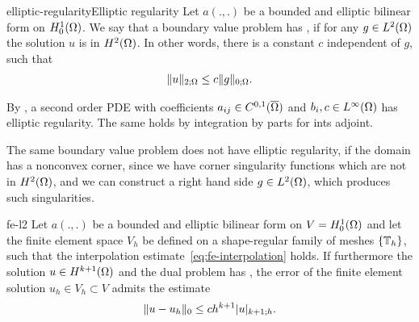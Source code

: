 \begin{Assumption*}{elliptic-regularity}{Elliptic regularity}
  Let $a(.,.)$ be a bounded and elliptic bilinear form on
  $H^1_0(\Omega)$. We say that a boundary value problem has
  , if for any $g\in L^2(\Omega)$ the
  solution $u$ is in $H^2(\Omega)$. In other words, there is a
  constant $c$ independent of $g$, such that
  \begin{gather}
    \lVert u\rVert_{2;\Omega} \le c \lVert g\rVert_{0;\Omega}.
  \end{gather}
\end{Assumption*}

\begin{example}
  By , a second order PDE with
  coefficients $a_{ij}\in C^{0,1}(\overline{\Omega})$ and
  $b_i, c\in L^\infty(\Omega)$ has elliptic regularity. The same
  holds by integration by parts for ints adjoint.

  The same boundary value problem does not have elliptic regularity,
  if the domain has a nonconvex corner, since we have corner
  singularity functions which are not in $H^2(\Omega)$, and we can
  construct a right hand side $g\in L^2(\Omega)$, which produces such
  singularities.
\end{example}

\begin{Theorem}{fe-l2}
  Let $a(.,.)$ be a bounded and elliptic bilinear form on
  $V = H^1_0(\Omega)$ and let the finite element space $V_h$ be
  defined on a shape-regular family of meshes $\{\mathbb T_h\}$, such that
  the interpolation estimate~\eqref{eq:fe-interpolation} holds. If
  furthermore the solution $u\in H^{k+1}(\Omega)$ and the dual
  problem has , the error of the finite
  element solution $u_h\in V_h \subset V$ admits the estimate
  \begin{gather}
    \lVert u-u_h\rVert_{0} \le c h^{k+1} \lvert u\rvert_{k+1;h}.
  \end{gather}
\end{Theorem}

